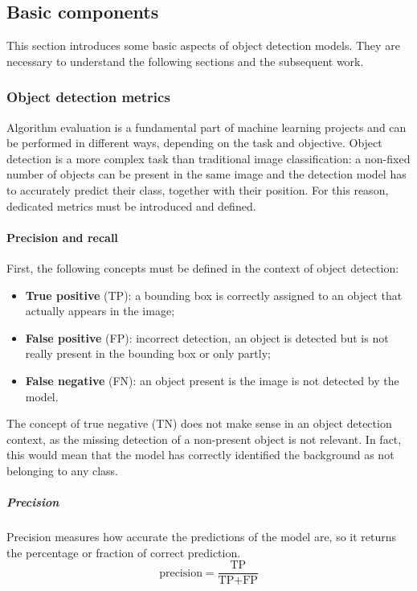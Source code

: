 \documentclass[%
    corpo=12pt,
    twoside,
    stile=classica,   
    tipotesi=magistrale,
    evenboxes,
    english,
	numerazioneromana,
]{toptesi}
\begin{document}
\subsection{Basic components}

This section introduces some basic aspects of object detection models. They are necessary to understand the following sections and the subsequent work.

\subsubsection{Object detection metrics}
Algorithm evaluation is a fundamental part of machine learning projects and can be performed in different ways, depending on the task and objective. Object detection is a more complex task than traditional image classification: a non-fixed number of objects can be present in the same image and the detection model has to accurately predict their class, together with their position. For this reason, dedicated metrics must be introduced and defined.

\paragraph{Precision and recall}
First, the following concepts must be defined in the context of object detection:
\begin{itemize}
	\item \textbf{True positive} (TP): a bounding box is correctly assigned to an object that actually appears in the image;
	\item \textbf{False positive} (FP): incorrect detection, an object is detected but is not really present in the bounding box or only partly;
	\item \textbf{False negative} (FN): an object present is the image is not detected by the model.
\end{itemize}
The concept of true negative (TN) does not make sense in an object detection context, as the missing detection of a non-present object is not relevant. In fact, this would mean that the model has correctly identified the background as not belonging to any class.

\subparagraph{Precision}
Precision measures how accurate the predictions of the model are, so it returns the percentage or fraction of correct prediction.
\begin{equation}
	\text{precision} = \frac{\text{TP}}{\text{TP}+\text{FP}}
\end{equation}
\end{document}
